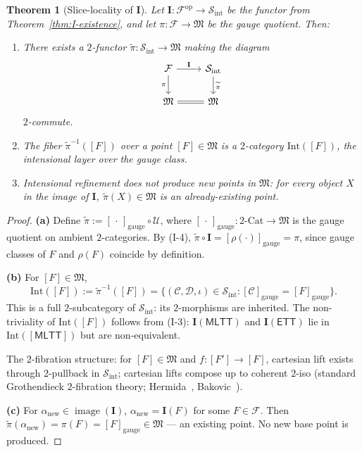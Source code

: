 \documentclass[11pt]{article}
\theoremstyle{plain}
\newtheorem{theorem}{Theorem}[section]
\theoremstyle{definition}
\newcommand{\cS}{\mathcal{S}}
\newcommand{\cF}{\mathcal{F}}
\newcommand{\cC}{\mathcal{C}}
\newcommand{\cD}{\mathcal{D}}
\newcommand{\fM}{\mathfrak{M}}
\newcommand{\Sint}{\cS_{\mathrm{int}}}
\newcommand{\Cat}{\mathrm{Cat}}
\newcommand{\MLTT}{\mathsf{MLTT}}
\newcommand{\ETT}{\mathsf{ETT}}
\newcommand{\II}{\mathbf{I}}
\newcommand{\cU}{\mathcal{U}}
\newcommand{\tpi}{\widetilde{\pi}}
\DeclareMathOperator{\image}{image}
\begin{document}
\begin{theorem}[Slice-locality of $\II$]\label{thm:slice-locality}
Let $\II : \cF^{\mathrm{op}} \to \Sint$ be the functor from Theorem~\ref{thm:I-existence}, and let $\pi : \cF \to \fM$ be the gauge quotient. Then:
\begin{enumerate}
\item[\textbf{(a)}] There exists a $2$-functor $\tpi : \Sint \to \fM$ making the diagram
\[
\begin{tikzcd}
\cF \arrow[r, "\II"] \arrow[d, "\pi"'] & \Sint \arrow[d, "\tpi"] \\
\fM \arrow[r, equal] & \fM
\end{tikzcd}
\]
$2$-commute.
\item[\textbf{(b)}] The fiber $\tpi^{-1}([F])$ over a point $[F] \in \fM$ is a $2$-category $\mathrm{Int}([F])$, the \emph{intensional layer over the gauge class}.
\item[\textbf{(c)}] Intensional refinement does not produce new points in $\fM$: for every object $X$ in the image of $\II$, $\tpi(X) \in \fM$ is an already-existing point.
\end{enumerate}
\end{theorem}

\begin{proof}

\textbf{(a)} Define $\tpi := [\, \cdot \,]_{\mathrm{gauge}} \circ \cU$, where $[\, \cdot \,]_{\mathrm{gauge}} : 2\text{-}\Cat \to \fM$ is the gauge quotient on ambient $2$-categories. By (I-4), $\tpi \circ \II = [\rho(\cdot)]_{\mathrm{gauge}} = \pi$, since gauge classes of $F$ and $\rho(F)$ coincide by definition.

\textbf{(b)} For $[F] \in \fM$,
\[ \mathrm{Int}([F]) := \tpi^{-1}([F]) = \{(\cC, \cD, \iota) \in \Sint : [\cC]_{\mathrm{gauge}} = [F]_{\mathrm{gauge}}\}. \]
This is a full $2$-subcategory of $\Sint$: its $2$-morphisms are inherited. The non-triviality of $\mathrm{Int}([F])$ follows from (I-3): $\II(\MLTT)$ and $\II(\ETT)$ lie in $\mathrm{Int}([\MLTT])$ but are non-equivalent.

The $2$-fibration structure: for $[F] \in \fM$ and $f : [F'] \to [F]$, cartesian lift exists through $2$-pullback in $\Sint$; cartesian lifts compose up to coherent $2$-iso (standard Grothendieck $2$-fibration theory; Hermida~\cite{Hermida1999}, Bakovic~\cite{Bakovic2010}).

\textbf{(c)} For $\alpha_{\mathrm{new}} \in \image(\II)$, $\alpha_{\mathrm{new}} = \II(F)$ for some $F \in \cF$. Then $\tpi(\alpha_{\mathrm{new}}) = \pi(F) = [F]_{\mathrm{gauge}} \in \fM$ --- an existing point. No new base point is produced.
\end{proof}
\end{document}
